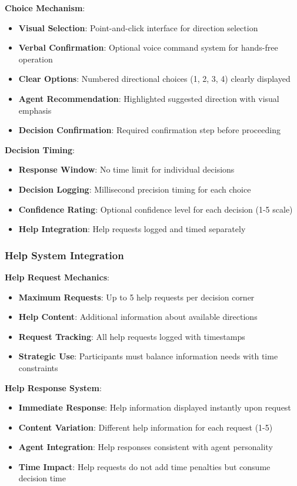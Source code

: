 \documentclass[12pt]{article}
\begin{document}
\textbf{Choice Mechanism}:
\begin{itemize}
    \item \textbf{Visual Selection}: Point-and-click interface for direction selection
    \item \textbf{Verbal Confirmation}: Optional voice command system for hands-free operation
    \item \textbf{Clear Options}: Numbered directional choices (1, 2, 3, 4) clearly displayed
    \item \textbf{Agent Recommendation}: Highlighted suggested direction with visual emphasis
    \item \textbf{Decision Confirmation}: Required confirmation step before proceeding
\end{itemize}

\textbf{Decision Timing}:
\begin{itemize}
    \item \textbf{Response Window}: No time limit for individual decisions
    \item \textbf{Decision Logging}: Millisecond precision timing for each choice
    \item \textbf{Confidence Rating}: Optional confidence level for each decision (1-5 scale)
    \item \textbf{Help Integration}: Help requests logged and timed separately
\end{itemize}

\subsubsection{Help System Integration}

\textbf{Help Request Mechanics}:
\begin{itemize}
    \item \textbf{Maximum Requests}: Up to 5 help requests per decision corner
    \item \textbf{Help Content}: Additional information about available directions
    \item \textbf{Request Tracking}: All help requests logged with timestamps
    \item \textbf{Strategic Use}: Participants must balance information needs with time constraints
\end{itemize}

\textbf{Help Response System}:
\begin{itemize}
    \item \textbf{Immediate Response}: Help information displayed instantly upon request
    \item \textbf{Content Variation}: Different help information for each request (1-5)
    \item \textbf{Agent Integration}: Help responses consistent with agent personality
    \item \textbf{Time Impact}: Help requests do not add time penalties but consume decision time
\end{itemize}
\end{document}
